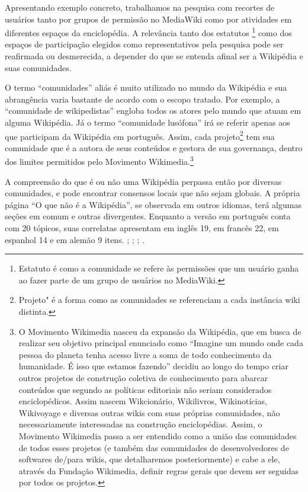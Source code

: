 Apresentando exemplo concreto, trabalhamos na pesquisa com recortes de usuários tanto por grupos de permissão no MediaWiki como por atividades em diferentes espaços da enciclopédia. A relevância tanto dos estatutos \footnote{Estatuto é como a comunidade se refere às permissões que um usuário ganha ao fazer parte de um grupo de usuários no MediaWiki.} como dos espaços de participação elegidos como representativos pela pesquisa pode ser reafirmada ou desmerecida, a depender do que se entenda afinal ser a Wikipédia e suas comunidades.

O termo ``comunidades'' aliás é muito utilizado no mundo da Wikipédia e sua abrangência varia bastante de acordo com o escopo tratado. Por exemplo, a ``comunidade de wikipedistas'' engloba todos os atores pelo mundo que atuam em alguma Wikipédia. Já o termo ``comunidade lusófona'' irá se referir apenas aos que participam da Wikipédia em português. Assim, cada projeto\footnote{Projeto" é a forma como as comunidades se referenciam a cada instância wiki distinta.} tem sua comunidade que é a autora de seus conteúdos e gestora de sua governança, dentro dos limites permitidos pelo Movimento Wikimedia.\footnote{O Movimento Wikimedia nasceu da expansão da Wikipédia, que em busca de realizar seu objetivo principal enunciado como ``Imagine um mundo onde cada pessoa do planeta tenha acesso livre a soma de todo conhecimento da humanidade. É isso que estamos fazendo'' decidiu ao longo do tempo criar outros projetos de construção coletiva de conhecimento para abarcar conteúdos que segundo as políticas editoriais não seriam considerados enciclopédicos. Assim nascem Wikcionário, Wikilivros, Wikinotícias, Wikivoyage e diversas outras wikis com suas próprias comunidades, não necessariamente interessadas na construção enciclopédias. Assim, o Movimento Wikimedia passa a ser entendido como a união das comunidades de todos esses projetos (e também das comunidades de desenvolvedores de softwares de/para wikis, que detalharemos posteriormente) e cabe a ele, através da Fundação Wikimedia, definir regras gerais que devem ser seguidas por todos os projetos.}

A compreensão do que é ou não uma Wikipédia perpassa então por diversas comunidades, e pode encontrar consensos locais que não sejam globais. A própria página “O que não é a Wikipédia”, se observada em outros idiomas, terá algumas seções em comum e outras divergentes. Enquanto a versão em português conta com 20 tópicos, suas correlatas apresentam em inglês 19, em francês 22, em espanhol 14 e em alemão 9 itens. ; ; ; . 

